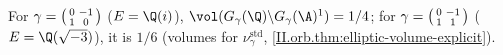 For $\gamma=\begin{psmallmatrix}0&-1\\1&0\end{psmallmatrix}$ ($E=\Q(i)$),
$\vol(G_\gamma(\Q)\backslash G_\gamma(\A)^1)=1/4$; for $\gamma=\begin{psmallmatrix}0&-1\\1&1\end{psmallmatrix}$ ($E=\Q(\sqrt{-3})$), it is $1/6$ (volumes for
$\nu_\gamma^{\mathrm{std}}$, \cref{II.orb.thm:elliptic-volume-explicit}).
